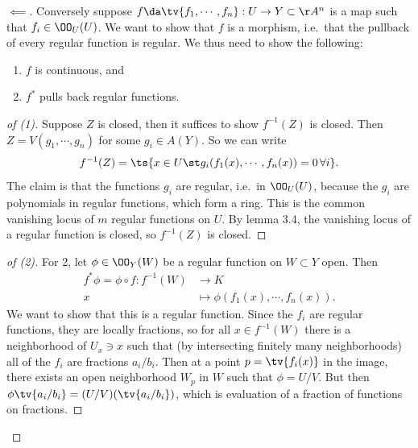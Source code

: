 \begin{proof}[$\impliedby$]

Conversely suppose \(f \da \tv{f_1, \cdots, f_n}: U\to Y \subset \AA^n\)
is a map such that \(f_i \in \OO_U(U)\). We want to show that \(f\) is a
morphism, i.e.~that the pullback of every regular function is regular.
We thus need to show the following:

\begin{claim}

\envlist

\begin{enumerate}
\def\labelenumi{\arabic{enumi}.}
\tightlist
\item
  \(f\) is continuous, and
\item
  \(f^*\) pulls back regular functions.
\end{enumerate}

\end{claim}

\begin{proof}[of (1)]

Suppose \(Z\) is closed, then it suffices to show \(f^{-1} (Z)\) is
closed. Then \(Z = V(g_1, \cdots, g_n)\) for some \(g_i \in A(Y)\). So
we can write
\begin{align*}  
f^{-1} (Z) = \ts{
x\in U \st g_i(f_1(x), \cdots, f_n(x)  ) = 0\, \forall i
}
.\end{align*} The claim is that the functions \(g_i\) are regular,
i.e.~in \(\OO_U(U)\), because the \(g_i\) are polynomials in regular
functions, which form a ring. This is the common vanishing locus of
\(m\) regular functions on \(U\). By lemma 3.4, the vanishing locus of a
regular function is closed, so \(f^{-1} (Z)\) is closed.

\end{proof}

\begin{proof}[of (2)]

For 2, let \(\phi \in \OO_Y(W)\) be a regular function on \(W\subset Y\)
open. Then
\begin{align*}  
f^* \phi  = \phi \circ f: f^{-1} (W) &\to K \\
x &\mapsto \phi(f_1(x), \cdots, f_n(x))
.\end{align*} We want to show that this is a regular function. Since the
\(f_i\) are regular functions, they are locally fractions, so for all
\(x\in f^{-1} (W)\) there is a neighborhood of \(U_x\ni x\) such that
(by intersecting finitely many neighborhoods) all of the \(f_i\) are
fractions \(a_i/b_i\). Then at a point \(p = \tv{f_i(x)}\) in the image,
there exists an open neighborhood \(W_p\) in \(W\) such that
\(\phi = U/V\). But then \(\phi{\tv{a_i /b_i}} = (U/V)(\tv{a_i/b_i})\),
which is evaluation of a fraction of functions on fractions.

\end{proof}

\end{proof}

